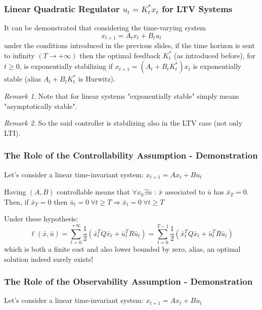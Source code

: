 \documentclass[openany]{book}
\theoremstyle{definition}
\theoremstyle{remark}
\newtheorem*{remark}{Remark}
\begin{document}
\subsubsection{Linear Quadratic Regulator $u_t = K_t^*x_t$ for LTV Systems}

It can be demonstrated that considering the time-varying system
\[
    x_{t+1} = A_tx_t + B_tu_t
\]
under the conditions introduced in the previous slides, if the time horizon is sent to infinity $(T\to+\infty)$ then the optimal feedback $K_t^*$ (as introduced before), for $t\geq 0$, is exponentially stabilizing if $x_{t+1} = (A_t + B_tK_t^*)x_t$ is exponentially stable (alias $A_t + B_tK_t^*$ is Hurwitz).

\begin{remark}
Note that for linear systems "exponentially stable" simply means "asymptotically stable".
\end{remark}

\begin{remark}
So the said controller is stabilizing also in the LTV case (not only LTI).
\end{remark}

\subsubsection{The Role of the Controllability Assumption - Demonstration}

Let's consider a linear time-invariant system: $x_{t+1} = Ax_t + Bu_t$

Having $(A,B)$ controllable means that $\forall x_0 \exists \bar{u}$ : $\bar{x}$ associated to $\bar{u}$ has $\bar{x}_T = 0$.
Then, if $\bar{x}_T = 0$ then $\bar{u}_t = 0 \: \forall t \geq T \Rightarrow \bar{x}_t = 0 \: \forall t \geq T$

Under these hypothesis:
\[
    \ell(\bar{x},\bar{u}) = \sum_{t=0}^{+\infty}\frac{1}{2}(\bar{x}_t^TQ\bar{x}_t + \bar{u}_t^TR\bar{u}_t) = \sum_{t=0}^{T-1}\frac{1}{2}(\bar{x}_t^TQ\bar{x}_t + \bar{u}_t^TR\bar{u}_t)
\]
which is both a finite cost and also lower bounded by zero, alias, an optimal solution indeed surely exists!

\subsubsection{The Role of the Observability Assumption - Demonstration}

Let's consider a linear time-invariant system: $x_{t+1} = Ax_t + Bu_t$
\end{document}
